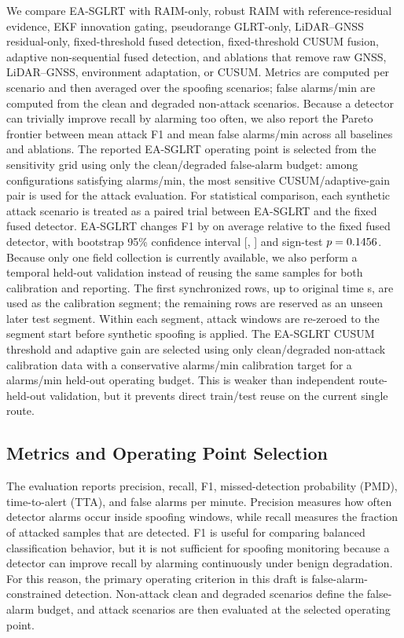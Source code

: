 \documentclass[journal]{IEEEtran}
\begin{document}
We compare EA-SGLRT with RAIM-only, robust RAIM with reference-residual evidence, EKF innovation gating, pseudorange GLRT-only, LiDAR--GNSS residual-only, fixed-threshold fused detection, fixed-threshold CUSUM fusion, adaptive non-sequential fused detection, and ablations that remove raw GNSS, LiDAR--GNSS, environment adaptation, or CUSUM.
Metrics are computed per scenario and then averaged over the \MatrixAttackScenarioCount{} spoofing scenarios; false alarms/min are computed from the clean and degraded non-attack scenarios.
Because a detector can trivially improve recall by alarming too often, we also report the Pareto frontier between mean attack F1 and mean false alarms/min across all baselines and ablations.
The reported EA-SGLRT operating point is selected from the sensitivity grid using only the clean/degraded false-alarm budget: among configurations satisfying \AdaptiveSeqFaBudget{} alarms/min, the most sensitive CUSUM/adaptive-gain pair is used for the attack evaluation.
For statistical comparison, each synthetic attack scenario is treated as a paired trial between EA-SGLRT and the fixed fused detector.
EA-SGLRT changes F1 by \AdaptiveVsFixedFoneGain{} on average relative to the fixed fused detector, with bootstrap 95\% confidence interval [\AdaptiveVsFixedCiLow{}, \AdaptiveVsFixedCiHigh{}] and sign-test $p=0.1456{}$.
Because only one field collection is currently available, we also perform a temporal held-out validation instead of reusing the same samples for both calibration and reporting.
The first \TemporalHoldoutTrainRows{} synchronized rows, up to original time \TemporalHoldoutSplitTime{} s, are used as the calibration segment; the remaining \TemporalHoldoutTestRows{} rows are reserved as an unseen later test segment.
Within each segment, attack windows are re-zeroed to the segment start before synthetic spoofing is applied.
The EA-SGLRT CUSUM threshold and adaptive gain are selected using only clean/degraded non-attack calibration data with a conservative \TemporalHoldoutCalibrationFaLimit{} alarms/min calibration target for a \TemporalHoldoutFinalFaBudget{} alarms/min held-out operating budget.
This is weaker than independent route-held-out validation, but it prevents direct train/test reuse on the current single route.

\subsection{Metrics and Operating Point Selection}
The evaluation reports precision, recall, F1, missed-detection probability (PMD), time-to-alert (TTA), and false alarms per minute.
Precision measures how often detector alarms occur inside spoofing windows, while recall measures the fraction of attacked samples that are detected.
F1 is useful for comparing balanced classification behavior, but it is not sufficient for spoofing monitoring because a detector can improve recall by alarming continuously under benign degradation.
For this reason, the primary operating criterion in this draft is false-alarm-constrained detection.
Non-attack clean and degraded scenarios define the false-alarm budget, and attack scenarios are then evaluated at the selected operating point.
\end{document}
